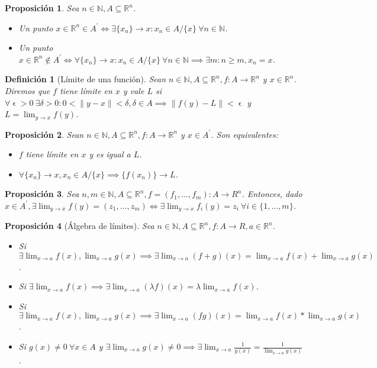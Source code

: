\documentclass[11pt, a4paper]{article}
\newif\IfInSansMode
\let\epsilon\upvarepsilon
\newcommand{\R}{\mathbb{R}} \newcommand{\N}{\mathbb{N}}
\newcommand{\xn}{\{x_n\}}
\theoremstyle{theorem-style}
\newtheorem{nprop}{Proposición}[section]
\theoremstyle{definition-style}
\newtheorem{ndef}{Definición}[section]
\theoremstyle{remark-style}
\theoremstyle{example-style}
\begin{document}
\begin{nprop}
Sea $n \in \N, A \subseteq \R^n$.

\begin{itemize}
	\item Un punto $x \in \R^n \in A^{'} \Leftrightarrow \exists \xn \to x : x_n \in A/\{x\} \ \forall n \in \N$.
	\item Un punto $x \in \R^n \not\in A^{'} \Leftrightarrow \forall \xn \to x : x_n \in A/\{x\} \ \forall n \in \N \implies \exists m: n \ge m, x_n = x$.
\end{itemize}
\end{nprop}

\begin{ndef}[Límite de una función]
Sean $n \in \N, A \subseteq \R^n, f:A \to \R^n$ y $x \in \R^n$. Diremos que $f$ tiene límite en $x$ y vale $L$ si $ \forall \epsilon > 0 \ \exists \delta > 0: 0 < \|y-x\| < \delta, \delta \in A \implies \|f(y)-L\| < \epsilon$ y $L = \lim_{y \to x} f(y)$.
\end{ndef}

\begin{nprop}
	Sean $n \in \N, A \subseteq \R^n, f:A \to \R^n$ y $x \in A^{'}$. Son equivalentes:
	
	\begin{itemize}
		\item $f$ tiene límite en $x$ y es igual a $L$.
		\item $\forall \xn \to x, x_n \in A/\{x\} \implies \{f(x_n)\} \to L$.
	\end{itemize}
\end{nprop}

\begin{nprop}
	Sea $n,m \in \N, A \subseteq \R^n, f = (f_1,...,f_m):A \to R^n$. Entonces, dado $x \in A^{'}, \exists \lim_{y \to x} f(y) = (z_1,...,z_m) \Leftrightarrow \exists \lim_{y \to x} f_i(y) = z_i \ \forall i \in \{1,...,m\}$.
\end{nprop}

\begin{nprop}[Álgebra de límites]
	Sea $n \in \N, A \subseteq \R^n, f:A \to R, a \in \R^n$. 
	\begin{itemize}
		\item Si $\exists \lim_{x \to a} f(x), \lim_{x \to a} g(x) \implies \exists \lim_{x \to a} (f+g)(x) = \lim_{x \to a} f(x)+\lim_{x \to a} g(x)$.
		\item Si $ \exists \lim_{x \to a} f(x) \implies \exists \lim_{x \to a} (\lambda f)(x) = \lambda \lim_{x \to a} f(x)$.
		\item Si $ \exists \lim_{x \to a} f(x), \lim_{x \to a} g(x) \implies \exists \lim_{x \to a} (fg)(x) = \lim_{x \to a} f(x)*\lim_{x \to a} g(x)$.
		\item Si $g(x) \ne 0 \ \forall x \in A$ y $ \exists \lim_{x \to a} g(x) \ne 0 \implies \exists \lim_{x \to a} \frac{1}{g(x)} = \frac{1}{\lim_{x \to a} g(x)}$.
		\end{itemize}
\end{nprop}
\end{document}
